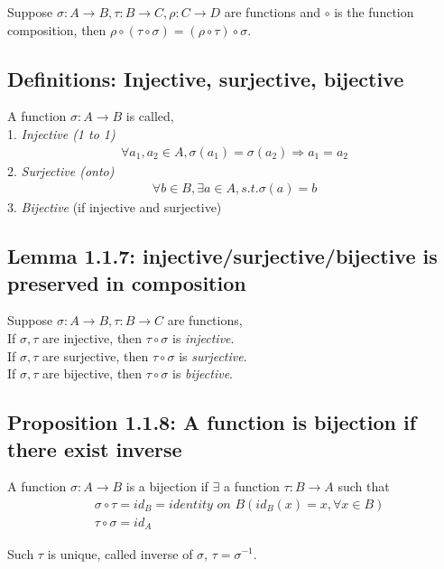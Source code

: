 \documentclass[11pt]{elegantbook}
\begin{document}
\begin{proposition}
    Suppose $\sigma:A \rightarrow B, \tau:B \rightarrow C, \rho:C \rightarrow D$ are functions and $\circ$ is the function composition, then $\rho\circ(\tau\circ\sigma)=(\rho\circ\tau)\circ\sigma$.
\end{proposition}
\subsection{Definitions: Injective, surjective, bijective}
A function $\sigma:A \rightarrow B$ is called,\\
1. \textit{Injective (1 to 1)}
\begin{equation}
    \begin{aligned}
        \forall a_1,a_2\in A, \sigma(a_1)=\sigma(a_2)\Rightarrow a_1=a_2
    \end{aligned}
    \nonumber
\end{equation}
2. \textit{Surjective (onto)}
\begin{equation}
    \begin{aligned}
        \forall b\in B,\exists a\in A, s.t. \sigma(a)=b
    \end{aligned}
    \nonumber
\end{equation}
3. \textit{Bijective} (if injective and surjective)

\subsection{Lemma 1.1.7: injective/surjective/bijective is preserved in composition}
\begin{lemma}[Lemma 1.1.7]
    Suppose $\sigma:A \rightarrow B, \tau: B \rightarrow C$ are functions,\\
    If $\sigma, \tau$ are injective, then $\tau\circ\sigma$ is \textit{injective}.\\
    If $\sigma, \tau$ are surjective, then $\tau\circ\sigma$ is \textit{surjective}.\\
    If $\sigma, \tau$ are bijective, then $\tau\circ\sigma$ is \textit{bijective}.
\end{lemma}

\subsection{Proposition 1.1.8: A function is bijection if there exist inverse}
\begin{proposition}[Proposition 1.1.8]
    A function $\sigma:A \rightarrow B$ is a bijection if $\exists$ a function $\tau:B \rightarrow A $ such that
    \begin{equation}
        \begin{aligned}
            &\sigma\circ\tau=id_B=\textit{identity on }B(id_B(x)=x, \forall x\in B)\\
            &\tau\circ\sigma=id_A
        \end{aligned}
        \nonumber
    \end{equation}
\end{proposition}
Such $\tau$ is unique, called inverse of $\sigma$, $\tau=\sigma^{-1}$.
\end{document}
